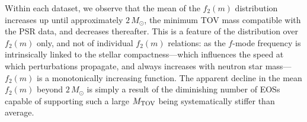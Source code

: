 \documentclass[aps,prd,twocolumn,superscriptaddress,footinbib]{revtex4-1}
\begin{document}
Within each dataset, we observe that the mean of the $f_2(m)$ distribution increases up until approximately $2\,M_\odot$, the minimum TOV mass compatible with the PSR data, and decreases thereafter. This is a feature of the distribution over $f_2(m)$ only, and not of individual $f_2(m)$ relations: as the $f$-mode frequency is intrinsically linked to the stellar compactness---which influences the speed at which perturbations propagate, and always increases with neutron star mass---$f_2(m)$ is a monotonically increasing function. The apparent decline in the mean $f_2(m)$ beyond $2\,M_\odot$ is simply a result of the diminishing number of EOSs capable of supporting such a large $M_{\rm TOV}$ being systematically stiffer than average.

\end{document}
